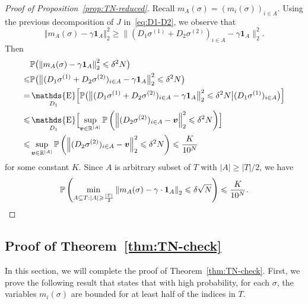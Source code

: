 \documentclass[letterpaper,11pt,reqno]{amsart}
\renewcommand{\le}{\leqslant}
\renewcommand{\ge}{\geqslant}
\newcommand{\norm}[1]{\left\Vert#1\right\Vert}
\newcommand{\abs}[1]{\left\vert#1\right\vert}
\newcommand{\mv}[1]{\boldsymbol{#1}}\newcommand{\mvinfty}{\boldsymbol{\infty}}\newcommand{\mvzero}{\boldsymbol{0}}
\newcommand{\mvm}{{m}}
\newcommand{\mvgs}{{\sigma}}
\newcommand{\bP}{\mathbb{P}}\newcommand{\bQ}{\mathbb{Q}}\newcommand{\bR}{\mathbb{R}}
\DeclareMathOperator{\E}{\mathds{E}}
\begin{document}
\begin{proof}[Proof of Proposition~\ref{prop:TN-reduced}]
Recall $\mvm_A(\mvgs) = (m_i(\mvgs))_{i\in A}$. 
Using the previous decomposition of $J$ in~\eqref{eq:D1-D2}, we observe that
\[
\norm{\mvm_A(\mvgs) - \gamma  \mv1_A}_2^2 \ge \bigl\|(D_1 \mvgs^{(1)} + D_2 \mvgs^{(2)})_{i \in A} - \gamma  \mv1_A\bigr\|_2^2.
\]
Then
\begin{align*}
    & \bP\bigl(\norm{\mvm_A(\mvgs) - \gamma \mv1_A}_2^2 \le \gd^2 N \bigr) \\
   \le & \bP\bigl(\bigl\|(D_1 \mvgs^{(1)} + D_2 \mvgs^{(2)})_{i\in A} - \gamma  \mv1_A\bigr\|_2^2\le \gd^2N \bigr) \\
   =  &  \E_{D_1} \Bigl[ \bP \bigl(\bigl\|(D_1 \mvgs^{(1)} + D_2 \mvgs^{(2)})_{i\in A}- \gamma \mv1_A\bigr\|_2^2\le \gd^2N  \big| (D_1\mvgs^{(1)})_{i\in A} \bigr) \Bigr]\\
   \le & \E_{D_1} \Bigl[ \sup_{\mvv \in \bR^{\abs{A}}}  \bP \left(\norm{(D_2\mvgs^{(2)})_{i\in A} - \mvv}_2^2\le \gd^2N  \right)\Bigr] \\
   \le & \sup_{\mvv \in \bR^{\abs{A}}} \bP\left(\norm{(D_2\mvgs^{(2)})_{i\in A} - \mvv}_2^2 \le \gd^2 N\right) \le \frac{K}{10^N}
\end{align*}
for some constant $K$. Since $A$ is arbitrary subset of $T$ with $\abs{A}\ge\abs{T}/2$, we have 
\begin{align*}
\bP\left( \min_{ A\subseteq T: |A| \ge \frac{\abs{T}}{2}}  \norm{\mvm_A(\mvgs) - \gamma\cdot \mv1_A}_{2} \le \gd \sqrt{N}\right) \le \frac{K}{10^N}.
\end{align*}


\end{proof}




\subsection{Proof of Theorem~\ref{thm:TN-check}}\label{ssec:pf-TN-tilde}
In this section, we will complete the proof of Theorem~\ref{thm:TN-check}. First, we prove the following result that states that with high probability, for each $\mvgs$, the variables $m_i(\mvgs)$ are bounded for at least half of the indices in $T$.
\end{document}
